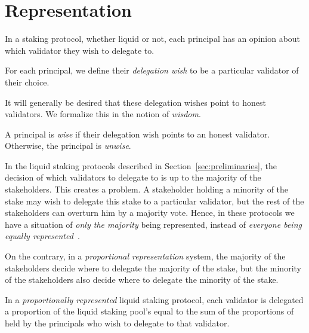 \section{Representation}

In a staking protocol, whether liquid or not, each principal has an opinion
about which validator they wish to delegate to.

\begin{definition}
  For each principal, we define
  their \emph{delegation wish} to be a particular validator of their choice.
\end{definition}

It will generally be desired that these delegation wishes point to
honest validators. We formalize this in the notion of \emph{wisdom}.

\begin{definition}[Wisdom]
  A principal is \emph{wise} if their delegation wish points to an honest
  validator. Otherwise, the principal is \emph{unwise}.
\end{definition}

In the liquid staking protocols described in Section~\ref{sec:preliminaries},
the decision of which validators to delegate to is up to the majority of the
stakeholders.
This creates a problem. A stakeholder holding a minority of the stake
may wish to delegate this stake to a particular validator, but the rest
of the stakeholders can overturn him by a majority vote. Hence, in these
protocols we have a situation of \emph{only the majority} being represented,
instead of \emph{everyone being equally represented}~\cite{mill1862true}.

On the contrary, in a \emph{proportional representation} system, the
majority of the stakeholders decide where to delegate the majority of
the stake, but the minority of the stakeholders also decide where to delegate
the minority of the stake.


%
%
%
%
%
\begin{definition}
  In a \emph{proportionally represented} liquid staking protocol,
  each validator is delegated a proportion of the liquid staking pool's \asset
  equal to the sum of the proportions of \stasset held by the principals
  who wish to delegate to that validator.
\end{definition}

